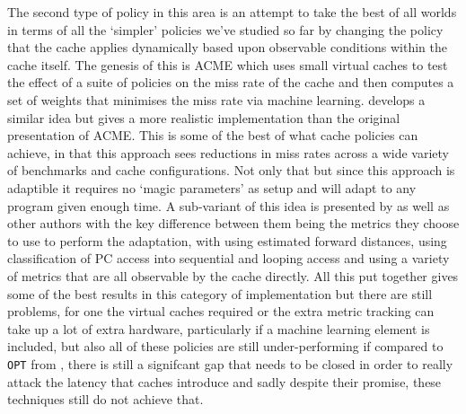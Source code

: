 The second type of policy in this area is an attempt to take the best of all worlds in terms of all the `simpler' policies we've studied so far by changing the policy that the cache applies dynamically based upon observable conditions within the cache itself. The genesis of this is ACME \cite{ariACMEAdaptiveCaching2002, gramacyAdaptiveCachingRefetching2003, riaz-ud-dinAcmeDBAdaptiveCaching2006} which uses small virtual caches to test the effect of a suite of policies on the miss rate of the cache and then computes a set of weights that minimises the miss rate via machine learning. \citet{subramanianAdaptiveCachesEffective2006a} develops a similar idea but gives a more realistic implementation than the original presentation of ACME. This is some of the best of what cache policies can achieve, in that this approach sees reductions in miss rates across a wide variety of benchmarks and cache configurations. Not only that but since this approach is adaptible it requires no `magic parameters' as setup and will adapt to any program given enough time. A sub-variant of this idea is presented by \citet{jongmoochoiDesignImplementationPerformance2002} as well as other authors \cite{smaragdakisGeneralAdaptiveReplacement2004, aguilarGeneralAdaptiveCache2004, aguilarCoherenceReplacementProtocolWeb2006, changAdaptiveBufferCache2016, changPARCNovelOS2018} with the key difference between them being the metrics they choose to use to perform the adaptation, with \citeauthor{jongmoochoiDesignImplementationPerformance2002} using estimated forward distances, \citeauthor{changAdaptiveBufferCache2016} using classification of PC access into sequential and looping access and  \citeauthor{aguilarGeneralAdaptiveCache2004} using a variety of metrics that are all observable by the cache directly. All this put together gives some of the best results in this category of implementation but there are still problems, for one the virtual caches required or the extra metric tracking can take up a lot of extra hardware, particularly if a machine learning element is included, but also all of these policies are still under-performing if compared to \texttt{OPT} from \citet{beladyStudyReplacementAlgorithms1966}, there is still a signifcant gap that needs to be closed in order to really attack the latency that caches introduce and sadly despite their promise, these techniques still do not achieve that.

